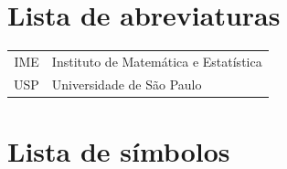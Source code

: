 \documentclass[12pt,twoside,brazilian]{book}
\begin{document}

\newcommand\disablenewpage[1]{{\let\clearpage\par\let\cleardoublepage\par #1}}

\bgroup
\raggedbottom


\disablenewpage{\chapter*{Lista de abreviaturas}}

\begin{tabular}{rl}
   IME & Instituto de Matemática e Estatística\\
   USP & Universidade de São Paulo
\end{tabular}

\disablenewpage{\chapter*{Lista de símbolos}}
\end{document}
